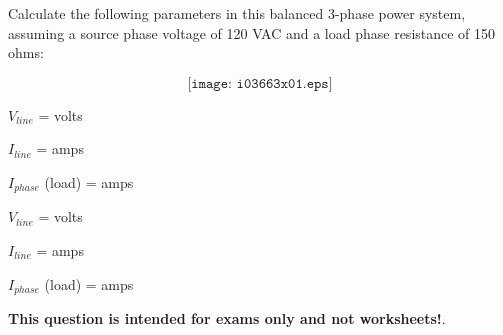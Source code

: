 

Calculate the following parameters in this balanced 3-phase power system, assuming a source phase voltage of 120 VAC and a load phase resistance of 150 ohms:

$$\texttt{[image: i03663x01.eps]}$$

$V_{line}$ = \underbar{\hskip 50pt} volts

\vskip 10pt

$I_{line}$ = \underbar{\hskip 50pt} amps

\vskip 10pt

$I_{phase}$ (load) = \underbar{\hskip 50pt} amps







$V_{line}$ =  volts

$I_{line}$ =  amps

$I_{phase}$ (load) =  amps







{\bf This question is intended for exams only and not worksheets!}.


